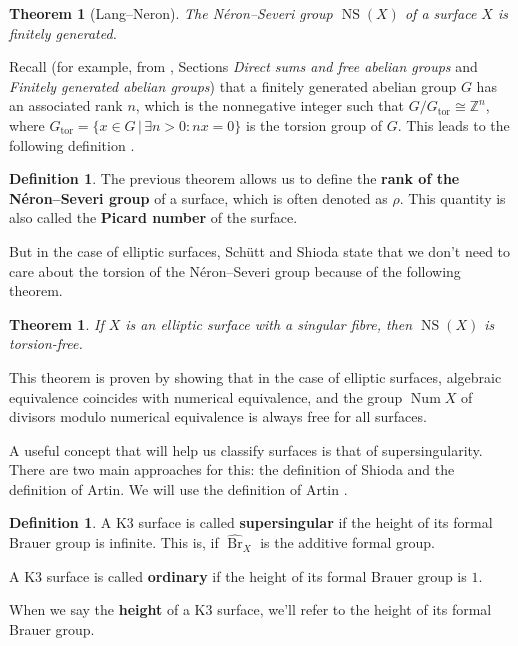\documentclass{report}
\DeclareMathOperator{\Br}{Br}
\DeclareMathOperator{\NS}{NS}
\DeclareMathOperator{\Num}{Num}
\newtheorem{theorem}[equation]{Theorem}
\theoremstyle{definition}
\newtheorem{definition}[equation]{Definition}
\begin{document}
\begin{theorem}[Lang--Neron]
The N\'{e}ron--Severi group $\NS(X)$ of a surface $X$ is finitely generated.
\end{theorem}

Recall (for example, from \cite[Chapter~I]{lang1965algebra}, Sections \emph{Direct sums and free abelian groups} and \emph{Finitely generated abelian groups}) that a finitely generated abelian group $G$ has an associated rank $n$, which is the nonnegative integer such that $G/G_{\text{tor}}\cong\mathbb{Z}^n$, where $G_{\text{tor}}=\{x\in G\,|\,\exists n>0:nx=0\}$ is the torsion group of $G$. This leads to the following definition \cite{moonen1993picard}.

\begin{definition}
The previous theorem allows us to define the \textbf{rank of the N\'{e}ron--Severi group} of a surface, which is often denoted as $\rho$. This quantity is also called the \textbf{Picard number} of the surface.
\end{definition}

But in the case of elliptic surfaces, Sch\"{u}tt and Shioda \cite[Theorem~6.2]{schuett2009elliptic} state that we don't need to care about the torsion of the N\'{e}ron--Severi group because of the following theorem.

\begin{theorem}
If $X$ is an elliptic surface with a singular fibre, then $\NS(X)$ is torsion-free.
\end{theorem}

This theorem is proven by showing that in the case of elliptic surfaces, algebraic equivalence coincides with numerical equivalence, and the group $\Num X$ of divisors modulo numerical equivalence is always free for all surfaces.

A useful concept that will help us classify surfaces is that of supersingularity. There are two main approaches for this: the definition of Shioda and the definition of Artin. We will use the definition of Artin \cite[Definition~0.3]{artin1974supersingular}.

\begin{definition}
A K3 surface is called \textbf{supersingular} if the height of its formal Brauer group is infinite. This is, if $\widehat{\Br}_X$ is the additive formal group.

A K3 surface is called \textbf{ordinary} if the height of its formal Brauer group is $1$.

When we say the \textbf{height} of a K3 surface, we'll refer to the height of its formal Brauer group.
\end{definition}
\end{document}
